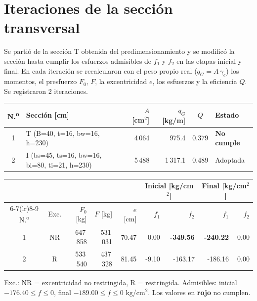 \documentclass[11pt,a4paper]{article}
\begin{document}
\section{Iteraciones de la sección transversal}
Se partió de la sección T obtenida del predimensionamiento y se modificó la sección hasta cumplir los esfuerzos
admisibles de $f_1$ y $f_2$ en las etapas inicial y final. En cada iteración se recalcularon con el peso propio real
($q_G = A\,\gamma_c$) los momentos, el presfuerzo $F_0$, $F$, la excentricidad $e$, los esfuerzos y la eficiencia $Q$.
Se registraron 2 iteraciones. 

\begin{center}\small
\begin{tabular}{clrrcl}
\toprule
N.\textsuperscript{o} & Sección [cm] & $A$ [cm$^2$] & $q_G$ [kg/m] & $Q$ & Estado \\
\midrule
1 & T  (B=40, t=16, bw=16, h=230) & 4\,064 & 975.4 & 0.379 & \textcolor{rojo}{\textbf{No cumple}} \\
2 & I  (bs=45, ts=16, bw=16, bi=80, ti=21, h=230) & 5\,488 & 1\,317.1 & 0.489 & \textcolor{verde}{Adoptada} \\
\bottomrule
\end{tabular}
\end{center}

\begin{center}\small\setlength{\tabcolsep}{4.5pt}
\begin{tabular}{ccrrrrrrr}
\toprule
& & & & & \multicolumn{2}{c}{Inicial [kg/cm$^2$]} & \multicolumn{2}{c}{Final [kg/cm$^2$]} \\
\cmidrule(lr){6-7}\cmidrule(lr){8-9}
N.\textsuperscript{o} & Exc. & $F_0$ [kg] & $F$ [kg] & $e$ [cm] & $f_1$ & $f_2$ & $f_1$ & $f_2$ \\
\midrule
1 & NR & 647\,858 & 531\,031 & 70.47 & 0.00 & \textcolor{rojo}{\textbf{-349.56}} & \textcolor{rojo}{\textbf{-240.22}} & 0.00 \\
2 & R & 533\,540 & 437\,328 & 81.45 & -9.10 & -163.17 & -186.16 & 0.00 \\
\bottomrule
\end{tabular}
\end{center}
Exc.: NR = excentricidad no restringida, R = restringida. Admisibles: inicial $-176.40 \le f \le 0$, final
$-189.00 \le f \le 0$ kg/cm$^2$. Los valores en \textcolor{rojo}{\textbf{rojo}} no cumplen.
\end{document}
